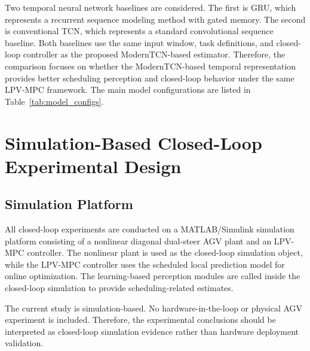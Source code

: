 \documentclass{ieeeaccess}
\begin{document}
Two temporal neural network baselines are considered. The first is GRU, which represents a recurrent sequence modeling method with gated memory. The second is conventional TCN, which represents a standard convolutional sequence baseline. Both baselines use the same input window, task definitions, and closed-loop controller as the proposed ModernTCN-based estimator. Therefore, the comparison focuses on whether the ModernTCN-based temporal representation provides better scheduling perception and closed-loop behavior under the same LPV-MPC framework. The main model configurations are listed in Table~\ref{tab:model_configs}.

\begin{table}[H]
\centering
{}
\caption{Model configurations of GRU, TCN and ModernTCN.}
\label{tab:model_configs}
\end{table}
\FloatBarrier



\section{Simulation-Based Closed-Loop Experimental Design}

\label{sec:experiment_design}



\subsection{Simulation Platform}



All closed-loop experiments are conducted on a MATLAB/Simulink simulation platform consisting of a nonlinear diagonal dual-steer AGV plant and an LPV-MPC controller. The nonlinear plant is used as the closed-loop simulation object, while the LPV-MPC controller uses the scheduled local prediction model for online optimization. The learning-based perception modules are called inside the closed-loop simulation to provide scheduling-related estimates.



The current study is simulation-based. No hardware-in-the-loop or physical AGV experiment is included. Therefore, the experimental conclusions should be interpreted as closed-loop simulation evidence rather than hardware deployment validation.
\end{document}
